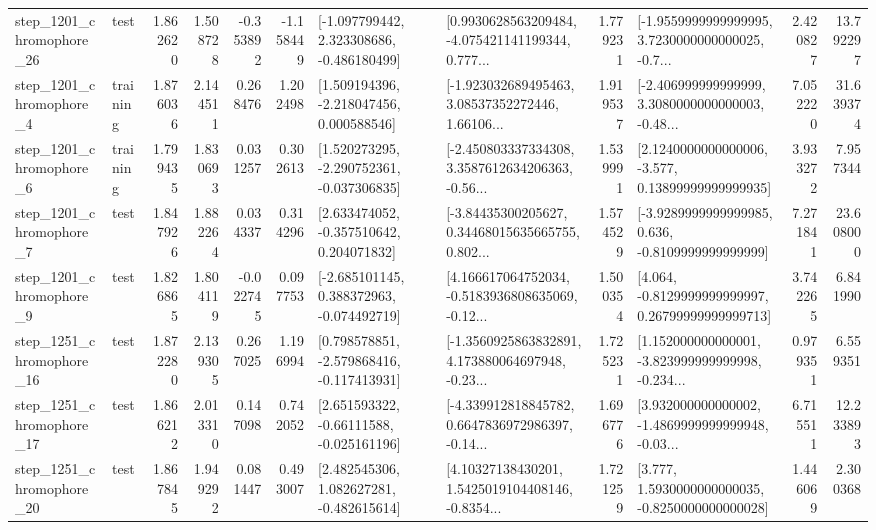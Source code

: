\begin{tabular}{llrrrrllrlrr}
 step\_1201\_chromophore\_26 &      test &      1.862620 &    1.508728 &     -0.353892 & -1.158449 &   [-1.097799442, 2.323308686, -0.486180499] &  [0.9930628563209484, -4.075421141199344, 0.777... &       1.779231 &  [-1.9559999999999995, 3.7230000000000025, -0.7... &            2.420827 &         13.792297 \\
  step\_1201\_chromophore\_4 &  training &      1.876036 &    2.144511 &      0.268476 &  1.202498 &    [1.509194396, -2.218047456, 0.000588546] &  [-1.923032689495463, 3.08537352272446, 1.66106... &       1.919537 &  [-2.406999999999999, 3.3080000000000003, -0.48... &            7.052220 &         31.639374 \\
  step\_1201\_chromophore\_6 &  training &      1.799435 &    1.830693 &      0.031257 &  0.302613 &   [1.520273295, -2.290752361, -0.037306835] &  [-2.450803337334308, 3.3587612634206363, -0.56... &       1.539991 &  [2.1240000000000006, -3.577, 0.13899999999999935] &            3.933272 &          7.957344 \\
  step\_1201\_chromophore\_7 &      test &      1.847926 &    1.882264 &      0.034337 &  0.314296 &    [2.633474052, -0.357510642, 0.204071832] &  [-3.84435300205627, 0.34468015635665755, 0.802... &       1.574529 &  [-3.9289999999999985, 0.636, -0.8109999999999999] &            7.271841 &         23.608000 \\
  step\_1201\_chromophore\_9 &      test &      1.826865 &    1.804119 &     -0.022745 &  0.097753 &   [-2.685101145, 0.388372963, -0.074492719] &  [4.166617064752034, -0.5183936808635069, -0.12... &       1.500354 &  [4.064, -0.8129999999999997, 0.26799999999999713] &            3.742265 &          6.841990 \\
 step\_1251\_chromophore\_16 &      test &      1.872280 &    2.139305 &      0.267025 &  1.196994 &   [0.798578851, -2.579868416, -0.117413931] &  [-1.3560925863832891, 4.173880064697948, -0.23... &       1.725231 &  [1.152000000000001, -3.823999999999998, -0.234... &            0.979351 &          6.559351 \\
 step\_1251\_chromophore\_17 &      test &      1.866212 &    2.013310 &      0.147098 &  0.742052 &    [2.651593322, -0.66111588, -0.025161196] &  [-4.339912818845782, 0.6647836972986397, -0.14... &       1.696776 &  [3.932000000000002, -1.4869999999999948, -0.03... &            6.715511 &         12.233893 \\
 step\_1251\_chromophore\_20 &      test &      1.867845 &    1.949292 &      0.081447 &  0.493007 &    [2.482545306, 1.082627281, -0.482615614] &  [4.10327138430201, 1.5425019104408146, -0.8354... &       1.721259 &   [3.777, 1.5930000000000035, -0.8250000000000028] &            1.446069 &          2.300368 \\

\end{tabular}
